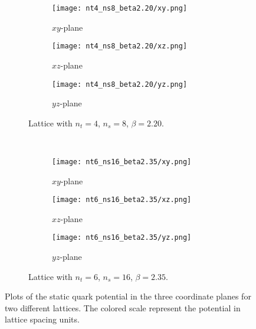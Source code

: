 \begin{figure}[!htbp]
    \centering
    \begin{subfigure}[t]{\textwidth}
        \centering
        \begin{subfigure}[t]{0.32\textwidth}
            \renewcommand\thesubfigure{\alph{subfigure}1}
            \texttt{[image: nt4\_ns8\_beta2.20/xy.png]}
            \caption{$xy$-plane}
            \label{4F:PotentialPlanes48xy}
        \end{subfigure}
        \hfill
        \begin{subfigure}[t]{0.32\textwidth}
            \addtocounter{subfigure}{-1}
            \renewcommand\thesubfigure{\alph{subfigure}2}
            \texttt{[image: nt4\_ns8\_beta2.20/xz.png]}
            \caption{$xz$-plane}
            \label{4F:PotentialPlanes48xz}
        \end{subfigure}
        \hfill
        \begin{subfigure}[t]{0.32\textwidth}
            \addtocounter{subfigure}{-1}
            \renewcommand\thesubfigure{\alph{subfigure}3}
            \texttt{[image: nt4\_ns8\_beta2.20/yz.png]}
            \caption{$yz$-plane}
            \label{4F:PotentialPlanes48yz}
        \end{subfigure}
        \addtocounter{subfigure}{-1}
        \caption{Lattice with $n_t=4$, $n_s=8$, $\beta=2.20$.}
        \label{4F:PotentialPlanes48}
    \end{subfigure}\\
    \vspace{\baselineskip}
    \begin{subfigure}[b]{\textwidth}
        \centering
        \begin{subfigure}[b]{0.32\textwidth}
            \renewcommand\thesubfigure{\alph{subfigure}1}
            \texttt{[image: nt6\_ns16\_beta2.35/xy.png]}
            \caption{$xy$-plane}
            \label{4F:PotentialPlanes616xy}
        \end{subfigure}
        \hfill
        \begin{subfigure}[b]{0.32\textwidth}
            \addtocounter{subfigure}{-1}
            \renewcommand\thesubfigure{\alph{subfigure}2}
            \texttt{[image: nt6\_ns16\_beta2.35/xz.png]}
            \caption{$xz$-plane}
            \label{4F:PotentialPlanes616xz}
        \end{subfigure}
        \hfill
        \begin{subfigure}[b]{0.32\textwidth}
            \addtocounter{subfigure}{-1}
            \renewcommand\thesubfigure{\alph{subfigure}3}
            \texttt{[image: nt6\_ns16\_beta2.35/yz.png]}
            \caption{$yz$-plane}
            \label{4F:PotentialPlanes616yz}
        \end{subfigure}
        \addtocounter{subfigure}{-1}
        \caption{Lattice with $n_t=6$, $n_s=16$, $\beta=2.35$.}
        \label{4F:PotentialPlanes616}
    \end{subfigure}
    \caption{Plots of the static quark potential in the three coordinate planes for two different lattices. The colored scale represent the potential in lattice spacing units.}
    \label{4F:PotentialPlanes}
\end{figure}
